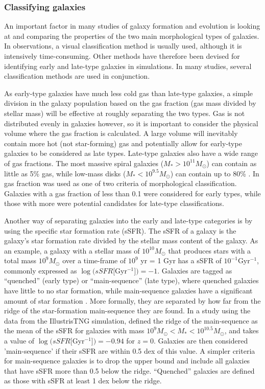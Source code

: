 \subsubsection{Classifying galaxies}

An important factor in many studies of galaxy formation and evolution is looking at and comparing the properties of the two main morphological types of galaxies. In observations, a visual classification method is usually used, although it is intensively time-consuming. %
Other methods have therefore been devised for identifying early and late-type galaxies in simulations. In many studies, several classification methods are used in conjunction. 

As early-type galaxies have much less cold gas than late-type galaxies, a simple division in the galaxy population based on the gas fraction (gas mass divided by stellar mass) will be effective at roughly separating the two types. Gas is not distributed evenly in galaxies however, so it is important to consider the physical volume where the gas fraction is calculated. A large volume will inevitably contain more hot (not star-forming) gas and potentially allow for early-type galaxies to be considered as late types. Late-type galaxies also have a wide range of gas fractions. The most massive spiral galaxies ($M_\ast > 10^{11} M_\odot$) can contain as little as 5\% gas, while low-mass disks ($M_\ast < 10^{9.5} M_\odot$) can contain up to 80\% \parencite{Mo2010}. In \textcite{Ferrero2020} gas fraction was used as one of two criteria of morphological classification. Galaxies with a gas fraction of less than 0.1 were considered for early types, while those with more were potential candidates for late-type classifications.

Another way of separating galaxies into the early and late-type categories is by using the specific star formation rate (sSFR). The sSFR of a galaxy is the galaxy's star formation rate divided by the stellar mass content of the galaxy. As an example, a galaxy with a stellar mass of $10^{10} M_\odot$ that produces stars with a total mass $10^9 M_\odot$ over a time-frame of $10^9$ yr = 1 Gyr has a sSFR of $10^{-1} $Gyr$^{-1}$, commonly expressed as $\log(sSFR[$Gyr$^{-1}]) = -1$. Galaxies are tagged as ``quenched'' (early type) or ``main-sequence'' (late type), where quenched galaxies have little to no star formation, while main-sequence galaxies have a significant amount of star formation \parencite{Noeske2007}. More formally, they are separated by how far from the ridge of the star-formation main-sequence they are found. In a study using the data from the IllustrisTNG simulation, \textcite{Genel2017} defined the ridge of the main-sequence as the mean of the sSFR for galaxies with mass $10^{9} M_{\odot} < M_* < 10^{10.5} M_{\odot}$, and takes a value of $\log (sSFR[$Gyr$^{-1}]) = -0.94$ for $z=0$. Galaxies are then considered 'main-sequence' if their sSFR are within 0.5 dex of this value. A simpler criteria for main-sequence galaxies is to drop the upper bound and include all galaxies that have sSFR more than 0.5 below the ridge. ``Quenched'' galaxies are defined as those with sSFR at least 1 dex below the ridge. 

